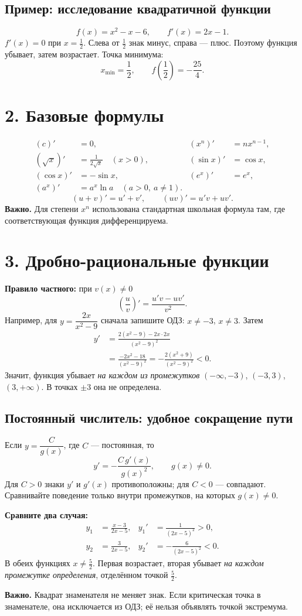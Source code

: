 \documentclass[a4paper,12pt]{article}
\newcommand{\term}[1]{\textcolor{darkaccent}{\textbf{#1}}}
\newcommand{\sect}[1]{\section*{\textcolor{darkaccent}{#1}}}
\newcommand{\subsect}[1]{\subsection*{\textcolor{accent}{#1}}}
\newcommand{\note}[1]{\textcolor{darkaccent}{\textbf{Важно.}} #1}
\begin{document}
\subsect{Пример: исследование квадратичной функции}
\[
 f(x)=x^2-x-6,\qquad f'(x)=2x-1.
\]
\(f'(x)=0\) при \(x=\frac12\). Слева от \(\frac12\) знак минус, справа --- плюс. Поэтому функция убывает, затем возрастает. Точка минимума:
\[
\boxed{x_{\min}=\frac12},\qquad f\!\left(\frac12\right)=-\frac{25}{4}.
\]

\sect{2. Базовые формулы}
\[
\begin{aligned}
 (c)'&=0,& (x^n)'&=nx^{n-1},\\[2pt]
 (\sqrt{x})'&=\frac1{2\sqrt{x}}\quad(x>0),&
 (\sin x)'&=\cos x,\\[2pt]
 (\cos x)'&=-\sin x,&
 (e^x)'&=e^x,\\[2pt]
 (a^x)'&=a^x\ln a\quad(a>0,\ a\ne1).
\end{aligned}
\]
\[
 (u+v)'=u'+v',\qquad (uv)'=u'v+uv'.
\]
\note{Для степени \(x^n\) использована стандартная школьная формула там, где соответствующая функция дифференцируема.}
\clearpage

\sect{3. Дробно-рациональные функции}
\term{Правило частного:} при \(v(x)\ne0\)
\[
\boxed{\left(\frac{u}{v}\right)'=\frac{u'v-uv'}{v^2}}.
\]
Например, для \(y=\dfrac{2x}{x^2-9}\) сначала запишите ОДЗ: \(x\ne-3\), \(x\ne3\). Затем
\[
\begin{aligned}
 y'&=\frac{2(x^2-9)-2x\cdot2x}{(x^2-9)^2}\\
   &=\frac{-2x^2-18}{(x^2-9)^2}
    =-\frac{2(x^2+9)}{(x^2-9)^2}<0.
\end{aligned}
\]
Значит, функция убывает \emph{на каждом из промежутков} \(( -\infty,-3)\), \((-3,3)\), \((3,+\infty)\). В точках \(\pm3\) она не определена.

\subsect{Постоянный числитель: удобное сокращение пути}
Если \(y=\dfrac{C}{g(x)}\), где \(C\) --- постоянная, то
\[
\boxed{y'=-\frac{C\,g'(x)}{g(x)^2}},\qquad g(x)\ne0.
\]
Для \(C>0\) знаки \(y'\) и \(g'(x)\) противоположны; для \(C<0\) --- совпадают. Сравнивайте поведение только внутри промежутков, на которых \(g(x)\ne0\).

\textbf{Сравните два случая:}
\[
\begin{aligned}
 y_1&=\frac{x-3}{2x-5},& y_1'&=\frac{1}{(2x-5)^2}>0,\\[3pt]
 y_2&=\frac{3}{2x-5},& y_2'&=-\frac{6}{(2x-5)^2}<0.
\end{aligned}
\]
В обеих функциях \(x\ne\frac52\). Первая возрастает, вторая убывает \emph{на каждом промежутке определения}, отделённом точкой \(\frac52\).

\note{Квадрат знаменателя не меняет знак.} Если критическая точка в знаменателе, она исключается из ОДЗ; её нельзя объявлять точкой экстремума.
\clearpage
\end{document}
